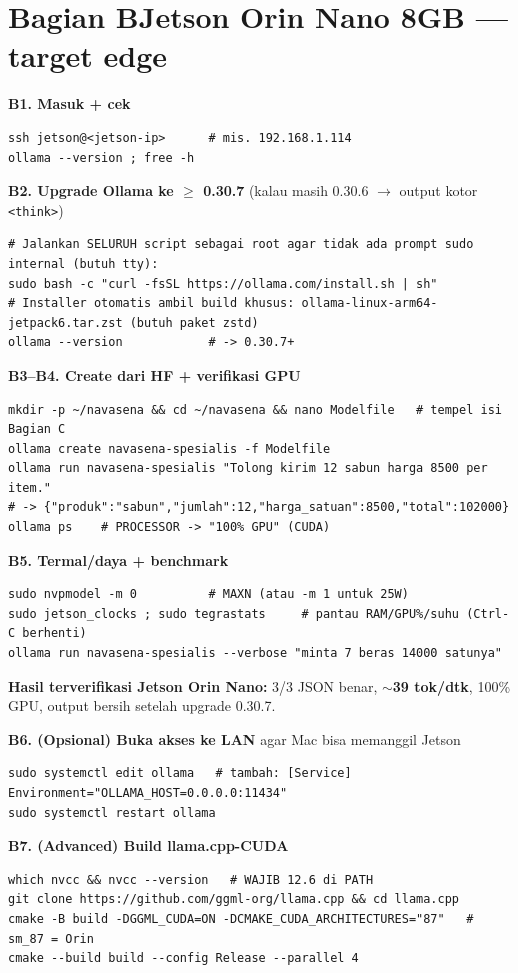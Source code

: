 \documentclass[11pt,a4paper]{article}
\begin{document}
\section*{\color{nvgreen}Bagian B\quad Jetson Orin Nano 8GB --- target edge}
\textbf{B1. Masuk + cek}
\begin{lstlisting}[style=nvsh]
ssh jetson@<jetson-ip>      # mis. 192.168.1.114
ollama --version ; free -h
\end{lstlisting}
\textbf{B2. Upgrade Ollama ke $\geq$ 0.30.7} (kalau masih 0.30.6 $\to$ output kotor \texttt{<think>})
\begin{lstlisting}[style=nvsh]
# Jalankan SELURUH script sebagai root agar tidak ada prompt sudo internal (butuh tty):
sudo bash -c "curl -fsSL https://ollama.com/install.sh | sh"
# Installer otomatis ambil build khusus: ollama-linux-arm64-jetpack6.tar.zst (butuh paket zstd)
ollama --version            # -> 0.30.7+
\end{lstlisting}
\textbf{B3--B4. Create dari HF + verifikasi GPU}
\begin{lstlisting}[style=nvsh]
mkdir -p ~/navasena && cd ~/navasena && nano Modelfile   # tempel isi Bagian C
ollama create navasena-spesialis -f Modelfile
ollama run navasena-spesialis "Tolong kirim 12 sabun harga 8500 per item."
# -> {"produk":"sabun","jumlah":12,"harga_satuan":8500,"total":102000}
ollama ps    # PROCESSOR -> "100% GPU" (CUDA)
\end{lstlisting}
\textbf{B5. Termal/daya + benchmark}
\begin{lstlisting}[style=nvsh]
sudo nvpmodel -m 0          # MAXN (atau -m 1 untuk 25W)
sudo jetson_clocks ; sudo tegrastats     # pantau RAM/GPU%/suhu (Ctrl-C berhenti)
ollama run navasena-spesialis --verbose "minta 7 beras 14000 satunya"
\end{lstlisting}
\begin{tip}\textbf{Hasil terverifikasi Jetson Orin Nano:} 3/3 JSON benar, \textbf{$\sim$39 tok/dtk}, 100\% GPU, output bersih setelah upgrade 0.30.7.\end{tip}
\textbf{B6. (Opsional) Buka akses ke LAN} agar Mac bisa memanggil Jetson
\begin{lstlisting}[style=nvsh]
sudo systemctl edit ollama   # tambah: [Service]  Environment="OLLAMA_HOST=0.0.0.0:11434"
sudo systemctl restart ollama
\end{lstlisting}
\textbf{B7. (Advanced) Build llama.cpp-CUDA}
\begin{lstlisting}[style=nvsh]
which nvcc && nvcc --version   # WAJIB 12.6 di PATH
git clone https://github.com/ggml-org/llama.cpp && cd llama.cpp
cmake -B build -DGGML_CUDA=ON -DCMAKE_CUDA_ARCHITECTURES="87"   # sm_87 = Orin
cmake --build build --config Release --parallel 4
\end{lstlisting}
\end{document}
